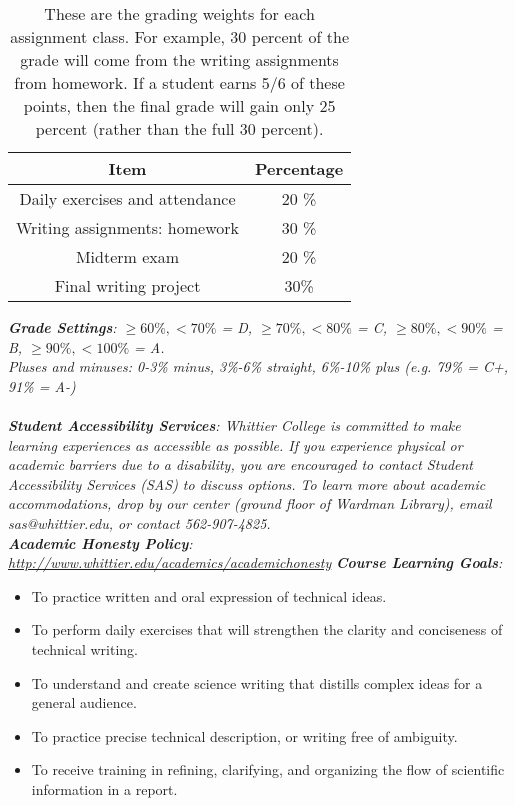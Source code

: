 \documentclass[10pt]{article}
\begin{document}
\begin{table}[h]
\centering
\begin{tabular}{| c | c |}
\hline
Item & Percentage \\ \hline \hline
Daily exercises and attendance & 20 \% \\ \hline
Writing assignments: homework & 30 \% \\ \hline
Midterm exam & 20 \% \\ \hline
Final writing project & 30\% \\ \hline
\end{tabular}
\caption{\label{tab:grades} These are the grading weights for each assignment class.  For example, 30 percent of the grade will come from the writing assignments from homework.  If a student earns 5/6 of these points, then the final grade will gain only 25 percent (rather than the full 30 percent).}
\end{table}
\textit{\textbf{Grade Settings}: $\geq 60\%, <70\%$ = D, $\geq 70\%, <80\%$ = C, $\geq 80\%, <90\%$ = B, $\geq 90\%, <100\%$ = A.  \\ Pluses and minuses: 0-3\% minus, 3\%-6\% straight, 6\%-10\% plus (e.g. 79\% = C+, 91\% = A-)} \\ \\
\textit{\textbf{Student Accessibility Services}: Whittier College is committed to make learning experiences as accessible as possible. If you experience physical or academic barriers due to a disability, you are encouraged to contact Student Accessibility Services (SAS) to discuss options. To learn more about academic accommodations, drop by our center (ground floor of Wardman Library), email sas@whittier.edu, or contact 562-907-4825.} \\
\textit{\textbf{Academic Honesty Policy}: \url{http://www.whittier.edu/academics/academichonesty}}
\clearpage
\textit{\textbf{Course Learning Goals}:}
\begin{itemize}
\item To practice written and oral expression of technical ideas.
\item To perform daily exercises that will strengthen the clarity and conciseness of technical writing.
\item To understand and create science writing that distills complex ideas for a general audience.
\item To practice precise technical description, or writing free of ambiguity.
\item To receive training in refining, clarifying, and organizing the flow of scientific information in a report.
\end{itemize}
\end{document}
